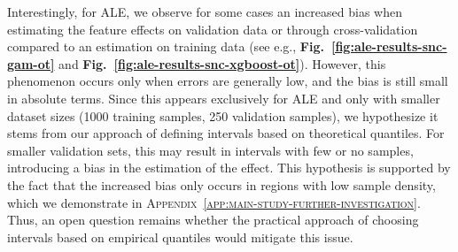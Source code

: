\documentclass[runningheads]{llncs}
\begin{document}
\noindent Interestingly, for ALE, we observe for some cases an increased bias when
estimating the feature effects on validation data or through cross-validation
compared to an estimation on training data (see e.g.,
\textbf{Fig.\@~\ref{fig:ale-results-snc-gam-ot}} and
\textbf{Fig.\@~\ref{fig:ale-results-snc-xgboost-ot}}). However, this phenomenon
occurs only when errors are generally low, and the bias is still small in absolute
terms. Since this appears exclusively for ALE and only with smaller dataset sizes
(1000 training samples, 250 validation samples), we hypothesize it stems from our
approach of defining intervals based on theoretical quantiles.
For smaller validation sets, this may result in intervals with few or no samples,
introducing a bias in the estimation of the effect. This hypothesis is supported
by the fact that the increased bias only occurs in regions with low sample
density, which we demonstrate in
\textsc{Appendix~\ref{app:main-study-further-investigation}}. Thus, an open
question remains whether the practical approach of choosing intervals based on
empirical quantiles would mitigate this issue.
\end{document}
